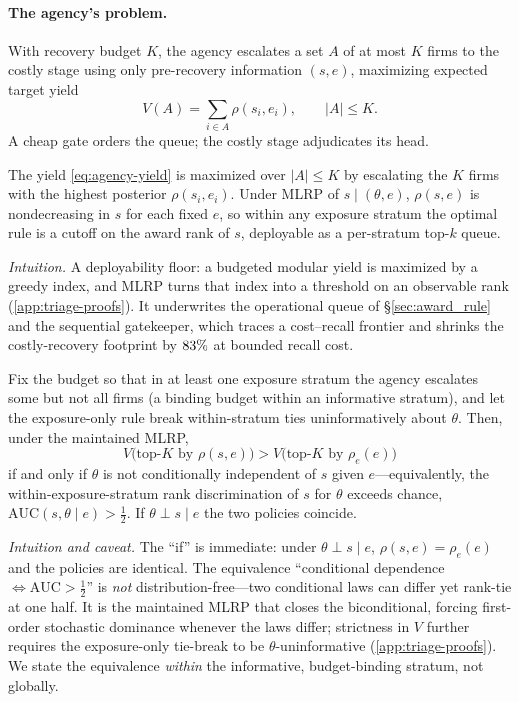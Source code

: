 \paragraph{The agency's problem.}
With recovery budget $K$, the agency escalates a set $A$ of at
most $K$ firms to the costly stage using only pre-recovery
information $(s,e)$, maximizing expected target yield
\begin{equation}
\label{eq:agency-yield}
V(A)=\sum_{i\in A}\rho(s_i,e_i),\qquad |A|\le K .
\end{equation}
A cheap gate orders the queue; the costly stage adjudicates its
head.

\begin{proposition}
\label{prop:index}
The yield \eqref{eq:agency-yield} is maximized over $|A|\le K$ by
escalating the $K$ firms with the highest posterior
$\rho(s_i,e_i)$. Under MLRP of $s\mid(\theta,e)$, $\rho(s,e)$ is
nondecreasing in $s$ for each fixed $e$, so within any exposure
stratum the optimal rule is a cutoff on the award rank of $s$,
deployable as a per-stratum top-$k$ queue.
\end{proposition}

\noindent\emph{Intuition.} A deployability floor: a budgeted
modular yield is maximized by a greedy index, and MLRP turns that
index into a threshold on an observable rank
(\ref{app:triage-proofs}). It underwrites the operational queue of
\S\ref{sec:award_rule} and the sequential gatekeeper, which traces
a cost--recall frontier and shrinks the costly-recovery footprint
by $83\%$ at bounded recall cost.

\begin{proposition}
\label{prop:incremental}
Fix the budget so that in at least one exposure stratum the agency
escalates some but not all firms (a binding budget within an
informative stratum), and let the exposure-only rule break
within-stratum ties uninformatively about $\theta$. Then, under
the maintained MLRP,
\[
V\!\big(\text{top-}K\text{ by }\rho(s,e)\big)>
V\!\big(\text{top-}K\text{ by }\rho_e(e)\big)
\]
if and only if $\theta$ is not conditionally independent of $s$
given $e$---equivalently, the within-exposure-stratum rank
discrimination of $s$ for $\theta$ exceeds chance,
$\mathrm{AUC}(s,\theta\mid e)>\tfrac12$. If $\theta\perp s\mid e$
the two policies coincide.
\end{proposition}

\noindent\emph{Intuition and caveat.} The ``if'' is immediate:
under $\theta\perp s\mid e$, $\rho(s,e)=\rho_e(e)$ and the policies
are identical. The equivalence ``conditional dependence
$\Leftrightarrow\mathrm{AUC}>\tfrac12$'' is \emph{not}
distribution-free---two conditional laws can differ yet rank-tie
at one half. It is the maintained MLRP that closes the
biconditional, forcing first-order stochastic dominance whenever
the laws differ; strictness in $V$ further requires the
exposure-only tie-break to be $\theta$-uninformative
(\ref{app:triage-proofs}). We state the equivalence \emph{within}
the informative, budget-binding stratum, not globally.


